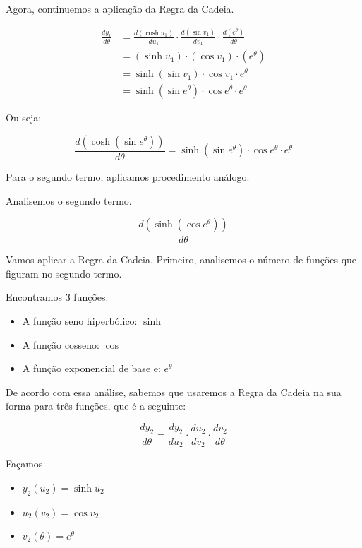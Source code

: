 \documentclass{article}
\begin{document}
Agora, continuemos a aplicação da Regra da Cadeia.

\begin{align*}
    \frac{dy_1}{d \theta}
     & =
    \frac{d(\cosh u_1)}{du_1} \cdot
    \frac{d(\sin v_1)}{dv_1} \cdot
    \frac{d(e^{\theta})}{d \theta}
    \\ & =
    (\sinh u_1) \cdot
    (\cos v_1) \cdot
    (e^{\theta})
    \\ & =
    \sinh (\sin v_1) \cdot
    \cos v_1 \cdot
    e^{\theta}
    \\ & =
    \sinh (\sin e^{\theta}) \cdot
    \cos e^{\theta} \cdot
    e^{\theta}
\end{align*}

Ou seja:

\begin{equation}\label{eq:q3_derivada_1}
    \frac{d(\cosh(\sin e^{\theta}))}{d\theta}
    =
    \sinh (\sin e^{\theta}) \cdot
    \cos e^{\theta} \cdot
    e^{\theta}
\end{equation}

Para o segundo termo, aplicamos procedimento análogo.

Analisemos o segundo termo.

\[
    \frac{d(\sinh(\cos e^{\theta}))}{d\theta}
\]

Vamos aplicar a Regra da Cadeia. Primeiro, analisemos o número
de funções que figuram no segundo termo.

Encontramos 3 funções:

\begin{itemize}
    \item A função seno hiperbólico: \(\sinh\)
    \item A função cosseno: \(\cos\)
    \item A função exponencial de base e: \(e^{\theta}\)
\end{itemize}

De acordo com essa análise, sabemos que usaremos a
Regra da Cadeia na sua forma para três funções, que é a seguinte:

\[
    \frac{dy_2}{d \theta}
    =
    \frac{dy_2}{du_2} \cdot \frac{du_2}{dv_2} \cdot \frac{dv_2}{d \theta}
\]

Façamos

\begin{itemize}
    \item \(y_2(u_2) = \sinh u_2\)
    \item \(u_2(v_2) = \cos v_2 \)
    \item \(v_2(\theta) = e^{\theta}\)
\end{itemize}
\end{document}
